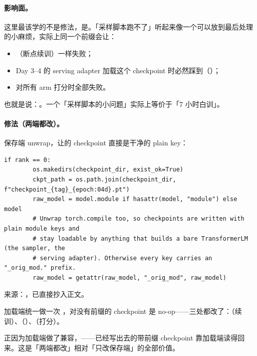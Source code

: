 \paragraph{影响面。}这里最该学的不是修法，是。「采样脚本跑不了」听起来像一个可以放到最后处理的小麻烦，实际上同一个前缀会让：

\begin{itemize}\itemsep2pt
  \item {}（断点续训）一样失败；
  \item Day 3--4 的 serving adapter 加载这个 checkpoint 时必然踩到（）；
  \item {} 对所有 arm 打分时全部失败。
\end{itemize}

也就是说：。一个「采样脚本的小问题」实际上等价于「7 小时白训」。

\paragraph{修法（两端都改）。}保存端 unwrap，让的 checkpoint 直接是干净的 plain key：

\begin{lstlisting}[style=hlnum, firstnumber=115]
    if rank == 0:
        os.makedirs(checkpoint_dir, exist_ok=True)
        ckpt_path = os.path.join(checkpoint_dir, f"checkpoint_{tag}_{epoch:04d}.pt")
        raw_model = model.module if hasattr(model, "module") else model
        # Unwrap torch.compile too, so checkpoints are written with plain module keys and
        # stay loadable by anything that builds a bare TransformerLM (the sampler, the
        # serving adapter). Otherwise every key carries an "_orig_mod." prefix.
        raw_model = getattr(raw_model, "_orig_mod", raw_model)
\end{lstlisting}
\noindent 来源：，已直接抄入正文。

加载端统一做一次 ，对没有前缀的 checkpoint 是 no-op——三处都改了：（续训）、（）、（打分）。

正因为加载端做了兼容，——已经写出去的带前缀 checkpoint 靠加载端读得回来。这是「两端都改」相对「只改保存端」的全部价值。

